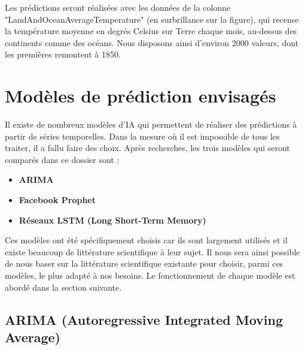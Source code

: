 \documentclass[french]{article}
\begin{document}
    Les prédictions seront réalisées avec les données de la colonne "LandAndOceanAverageTemperature" (en surbrillance sur la figure), qui recense la température moyenne en degrés Celsius sur Terre chaque mois, au-dessus des continents comme des océans. Nous disposons ainsi d'environ 2000 valeurs, dont les premières remontent à 1850.
    \section{Modèles de prédiction envisagés}

    Il existe de nombreux modèles d'IA qui permettent de réaliser des prédictions à partir de séries temporelles. Dans la mesure où il est impossible de tous les traiter, il a fallu faire des choix. Après recherches, les trois modèles qui seront comparés dans ce dossier sont :
    \begin{itemize}
        \item \textbf{ARIMA}
        \item \textbf{Facebook Prophet}
        \item \textbf{Réseaux LSTM (Long Short-Term Memory)}
    \end{itemize} 
    
    Ces modèles ont été spécifiquement choisis car ils sont largement utilisés et il existe beaucoup de littérature scientifique à leur sujet. Il nous sera ainsi possible de nous baser sur la littérature scientifique existante pour choisir, parmi ces modèles, le plus adapté à nos besoins. Le fonctionnement de chaque modèle est abordé dans la section suivante.

    \subsection{ARIMA (Autoregressive Integrated Moving Average)}
\end{document}
